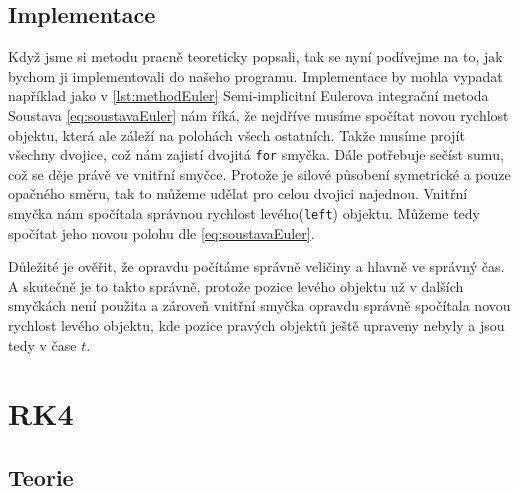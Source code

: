 \subsection{Implementace}
Když jsme si metodu pracně teoreticky popsali, tak se nyní podívejme na to, jak bychom ji implementovali do našeho programu. Implementace by mohla vypadat například jako v \ref{lst:methodEuler}
{Semi-implicitní Eulerova integrační metoda}
Soustava \ref{eq:soustavaEuler} nám říká, že nejdříve musíme spočítat novou rychlost objektu, která ale záleží na polohách všech ostatních. Takže musíme projít všechny dvojice, což nám zajistí dvojitá \texttt{for} smyčka. Dále potřebuje sečíst sumu, což se děje právě ve vnitřní smyčce. Protože je silové působení symetrické a pouze opačného směru, tak to můžeme udělat pro celou dvojici najednou.
Vnitřní smyčka nám spočítala správnou rychlost levého(\texttt{left}) objektu.
Můžeme tedy spočítat jeho novou polohu dle \eqref{eq:soustavaEuler}.

Důležité je ověřit, že opravdu počítáme správně veličiny a hlavně ve správný čas. A skutečně je to takto správně, protože pozice levého objektu už v dalších smyčkách není použita a zároveň vnitřní smyčka opravdu správně spočítala novou rychlost levého objektu, kde pozice pravých objektů ještě upraveny nebyly a jsou tedy v čase $ t $.


\section{RK4}
\label{sec:implRK4}
\subsection{Teorie}
\paragraph{}


